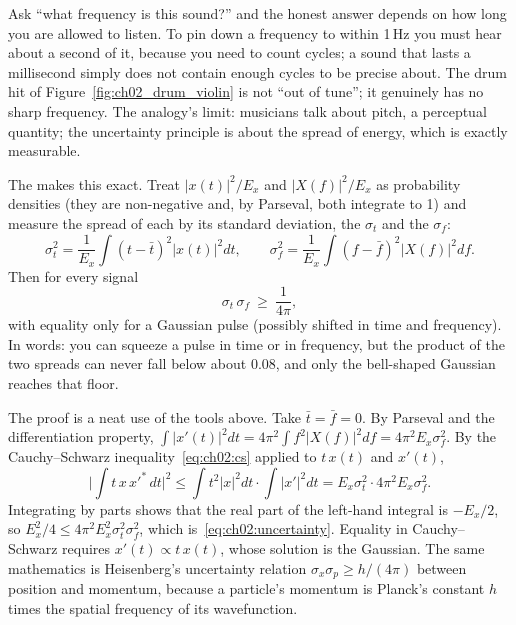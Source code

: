 
\begin{analogy}
Ask ``what frequency is this sound?'' and the honest answer depends on how long you are allowed to
listen. To pin down a frequency to within 1\,Hz you must hear about a second of it, because you need
to count cycles; a sound that lasts a millisecond simply does not contain enough cycles to be precise
about. The drum hit of Figure~\ref{fig:ch02_drum_violin} is not ``out of tune''; it genuinely has no
sharp frequency. The analogy's limit: musicians talk about pitch, a perceptual quantity; the
uncertainty principle is about the spread of energy, which is exactly measurable.
\end{analogy}

The  makes this exact. Treat $|x(t)|^2/E_x$ and $|X(f)|^2/E_x$ as
probability densities (they are non-negative and, by Parseval, both integrate to 1) and measure the
spread of each by its standard deviation, the  $\sigma_t$ and the
 $\sigma_f$:
\begin{equation}
\sigma_t^2=\frac1{E_x}\int(t-\bar t)^2|x(t)|^2dt,\qquad
\sigma_f^2=\frac1{E_x}\int(f-\bar f)^2|X(f)|^2df .
\end{equation}
Then for every signal
\begin{equation}
\sigma_t\,\sigma_f\ \ge\ \frac{1}{4\pi},
\label{eq:ch02:uncertainty}
\end{equation}
with equality only for a Gaussian pulse (possibly shifted in time and frequency). In words: you can
squeeze a pulse in time or in frequency, but the product of the two spreads can never fall below
about 0.08, and only the bell-shaped Gaussian reaches that floor.

\begin{deeper}
The proof is a neat use of the tools above. Take $\bar t=\bar f=0$. By Parseval and the
differentiation property, $\int|x'(t)|^2dt=4\pi^2\int f^2|X(f)|^2df=4\pi^2E_x\sigma_f^2$. By the
Cauchy--Schwarz inequality~\eqref{eq:ch02:cs} applied to $t\,x(t)$ and $x'(t)$,
\[
\Big|\int t\,x\,x'^*\,dt\Big|^2\le\int t^2|x|^2dt\cdot\int|x'|^2dt=E_x\sigma_t^2\cdot4\pi^2E_x\sigma_f^2 .
\]
Integrating by parts shows that the real part of the left-hand integral is $-E_x/2$, so
$E_x^2/4\le4\pi^2E_x^2\sigma_t^2\sigma_f^2$, which is~\eqref{eq:ch02:uncertainty}. Equality in
Cauchy--Schwarz requires $x'(t)\propto t\,x(t)$, whose solution is the Gaussian. The same mathematics
is Heisenberg's uncertainty relation $\sigma_x\sigma_p\ge h/(4\pi)$ between position and momentum,
because a particle's momentum is Planck's constant $h$ times the spatial frequency of its wavefunction.
\end{deeper}

